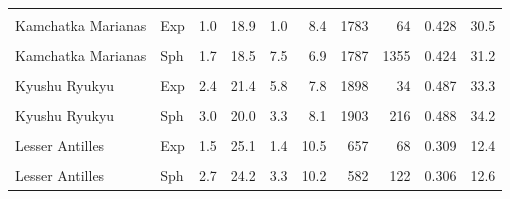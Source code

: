 \begin{ThreePartTable}
\begin{longtable}[t]{llrrrrrrrr}
\cellcolor{gray!6}{Kamchatka Marianas} & \cellcolor{gray!6}{Bes} & \cellcolor{gray!6}{3.9} & \cellcolor{gray!6}{25.1} & \cellcolor{gray!6}{1.0} & \cellcolor{gray!6}{11.0} & \cellcolor{gray!6}{1713} & \cellcolor{gray!6}{10} & \cellcolor{gray!6}{0.449} & \cellcolor{gray!6}{36.4}\\
Kamchatka Marianas & Exp & 1.0 & 18.9 & 1.0 & 8.4 & 1783 & 64 & 0.428 & 30.5\\
\cellcolor{gray!6}{Kamchatka Marianas} & \cellcolor{gray!6}{Lin} & \cellcolor{gray!6}{1.0} & \cellcolor{gray!6}{22.2} & \cellcolor{gray!6}{6.0} & \cellcolor{gray!6}{6.4} & \cellcolor{gray!6}{1797} & \cellcolor{gray!6}{1528} & \cellcolor{gray!6}{0.424} & \cellcolor{gray!6}{31.2}\\
Kamchatka Marianas & Sph & 1.7 & 18.5 & 7.5 & 6.9 & 1787 & 1355 & 0.424 & 31.2\\
\cellcolor{gray!6}{Kyushu Ryukyu} & \cellcolor{gray!6}{Bes} & \cellcolor{gray!6}{2.4} & \cellcolor{gray!6}{20.4} & \cellcolor{gray!6}{1.8} & \cellcolor{gray!6}{5.9} & \cellcolor{gray!6}{1843} & \cellcolor{gray!6}{3} & \cellcolor{gray!6}{0.491} & \cellcolor{gray!6}{33.4}\\
Kyushu Ryukyu & Exp & 2.4 & 21.4 & 5.8 & 7.8 & 1898 & 34 & 0.487 & 33.3\\
\cellcolor{gray!6}{Kyushu Ryukyu} & \cellcolor{gray!6}{Lin} & \cellcolor{gray!6}{3.2} & \cellcolor{gray!6}{19.8} & \cellcolor{gray!6}{3.3} & \cellcolor{gray!6}{8.3} & \cellcolor{gray!6}{1898} & \cellcolor{gray!6}{183} & \cellcolor{gray!6}{0.487} & \cellcolor{gray!6}{37.8}\\
Kyushu Ryukyu & Sph & 3.0 & 20.0 & 3.3 & 8.1 & 1903 & 216 & 0.488 & 34.2\\
\cellcolor{gray!6}{Lesser Antilles} & \cellcolor{gray!6}{Bes} & \cellcolor{gray!6}{2.0} & \cellcolor{gray!6}{18.3} & \cellcolor{gray!6}{2.5} & \cellcolor{gray!6}{7.2} & \cellcolor{gray!6}{554} & \cellcolor{gray!6}{13} & \cellcolor{gray!6}{0.329} & \cellcolor{gray!6}{20.9}\\
Lesser Antilles & Exp & 1.5 & 25.1 & 1.4 & 10.5 & 657 & 68 & 0.309 & 12.4\\
\cellcolor{gray!6}{Lesser Antilles} & \cellcolor{gray!6}{Lin} & \cellcolor{gray!6}{1.5} & \cellcolor{gray!6}{24.2} & \cellcolor{gray!6}{1.1} & \cellcolor{gray!6}{11.0} & \cellcolor{gray!6}{653} & \cellcolor{gray!6}{77} & \cellcolor{gray!6}{0.297} & \cellcolor{gray!6}{13.3}\\
Lesser Antilles & Sph & 2.7 & 24.2 & 3.3 & 10.2 & 582 & 122 & 0.306 & 12.6\\

\end{longtable}
\end{ThreePartTable}
